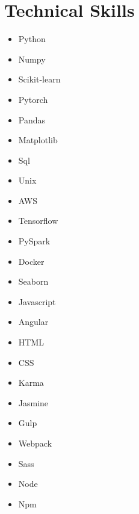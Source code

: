 \documentclass[10pt]{article}
\begin{document}
	\section{Technical Skills}
		\begin{multicols}{4}
			\begin{itemize}[noitemsep]
				
				\item Python 				
				\item Numpy 
				\item Scikit-learn 
				\item Pytorch
				\item Pandas 
				\item Matplotlib
				\columnbreak
				
				\item Sql 
				\item Unix 
				\item AWS
				\item Tensorflow 
				 
				\item PySpark
				\item Docker
				\columnbreak
				
				\item Seaborn 			
				\item Javascript 
				\item Angular 
				\item HTML 
				\item CSS 
				\item Karma 
				\columnbreak 
				
				\item Jasmine 
				\item Gulp 
				\item Webpack
				\item Sass
				\item Node 
				\item Npm 
				\columnbreak 
				
			\end{itemize}
		\end{multicols}
	
\end{document}
